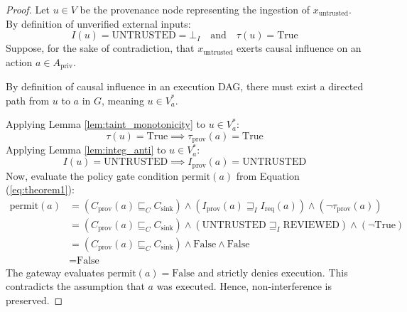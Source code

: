 \begin{proof}
Let $u \in V$ be the provenance node representing the ingestion of $x_{\text{untrusted}}$. By definition of unverified external inputs:
\begin{equation}
I(u) = \text{UNTRUSTED} = \bot_I \quad \text{and} \quad \tau(u) = \text{True}
\end{equation}
Suppose, for the sake of contradiction, that $x_{\text{untrusted}}$ exerts causal influence on an action $a \in A_{\text{priv}}$. 

By definition of causal influence in an execution DAG, there must exist a directed path from $u$ to $a$ in $G$, meaning $u \in V_a^*$.

Applying Lemma \ref{lem:taint_monotonicity} to $u \in V_a^*$:
\begin{equation}
\tau(u) = \text{True} \implies \tau_{\text{prov}}(a) = \text{True}
\end{equation}
Applying Lemma \ref{lem:integ_anti} to $u \in V_a^*$:
\begin{equation}
I(u) = \text{UNTRUSTED} \implies I_{\text{prov}}(a) = \text{UNTRUSTED}
\end{equation}
Now, evaluate the policy gate condition $\text{permit}(a)$ from Equation (\ref{eq:theorem1}):
\begin{align}
\text{permit}(a) &= (C_{\text{prov}}(a) \sqsubseteq_C C_{\text{sink}}) \land (I_{\text{prov}}(a) \sqsupseteq_I I_{\text{req}}(a)) \land (\neg \tau_{\text{prov}}(a)) \\
&= (C_{\text{prov}}(a) \sqsubseteq_C C_{\text{sink}}) \land (\text{UNTRUSTED} \sqsupseteq_I \text{REVIEWED}) \land (\neg \text{True}) \\
&= (C_{\text{prov}}(a) \sqsubseteq_C C_{\text{sink}}) \land \text{False} \land \text{False} \\
&= \text{False}
\end{align}
The gateway evaluates $\text{permit}(a) = \text{False}$ and strictly denies execution. This contradicts the assumption that $a$ was executed. Hence, non-interference is preserved.
\end{proof}

